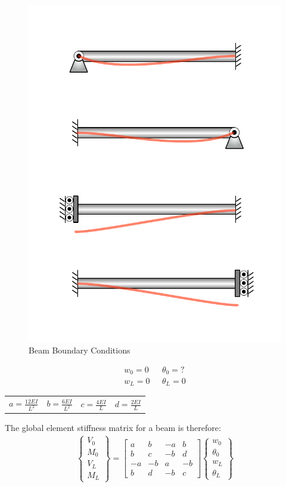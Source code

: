 \begin{figure}[H]	\centerline{\includegraphics[width=0.9\columnwidth]{Figures/BCFrame}}
	\caption{Beam Boundary Conditions}
	\label{fig:BCFrame}
\end{figure}

\begin{align*}
	w_0=0 & \text{	} \theta_0=?\\
	w_L=0 &\text{	}  \theta_L=0
\end{align*}

\begin{center}
	\begin{tabular}{cccc}
		$a=\frac{12EI}{L^3}$ & $b=\frac{6EI}{L^2}$ & $c=\frac{4EI}{L}$ & $d=\frac{2EI}{L}$
	\end{tabular}
\end{center}

The global element stiffness matrix for a beam is therefore:
\begin{align}
	\begin{Bmatrix}
		V_0\\ M_0\\ \hline V_L\\ M_L
	\end{Bmatrix}
	=
	\begin{bmatrix}
		a & b & -a & b\\
		b & c & -b & d\\
		-a & -b & a & -b\\
		b & d & -b & c
	\end{bmatrix}
	\begin{Bmatrix}
		w_0\\ \theta_0\\ \hline w_L\\ \theta_L
	\end{Bmatrix}
\end{align}

